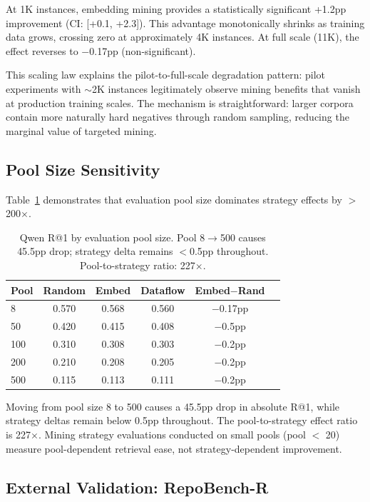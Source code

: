 \documentclass[11pt,a4paper]{article}
\begin{document}
At 1K instances, embedding mining provides a statistically significant +1.2pp improvement (CI: [+0.1, +2.3]).
This advantage monotonically shrinks as training data grows, crossing zero at approximately 4K instances.
At full scale (11K), the effect reverses to $-$0.17pp (non-significant).

This scaling law explains the pilot-to-full-scale degradation pattern: pilot experiments with $\sim$2K instances legitimately observe mining benefits that vanish at production training scales.
The mechanism is straightforward: larger corpora contain more naturally hard negatives through random sampling, reducing the marginal value of targeted mining.

\subsection{Pool Size Sensitivity}

Table~\ref{tab:pool_size} demonstrates that evaluation pool size dominates strategy effects by $>$200$\times$.

\begin{table}[t]
\centering
\small
\begin{tabular}{lccccc}
\toprule
Pool & Random & Embed & Dataflow & Embed$-$Rand \\
\midrule
8 & 0.570 & 0.568 & 0.560 & $-$0.17pp \\
50 & 0.420 & 0.415 & 0.408 & $-$0.5pp \\
100 & 0.310 & 0.308 & 0.303 & $-$0.2pp \\
200 & 0.210 & 0.208 & 0.205 & $-$0.2pp \\
500 & 0.115 & 0.113 & 0.111 & $-$0.2pp \\
\bottomrule
\end{tabular}
\caption{Qwen R@1 by evaluation pool size. Pool 8$\to$500 causes 45.5pp drop; strategy delta remains $<$0.5pp throughout. Pool-to-strategy ratio: 227$\times$.}
\label{tab:pool_size}
\end{table}

Moving from pool size 8 to 500 causes a 45.5pp drop in absolute R@1, while strategy deltas remain below 0.5pp throughout.
The pool-to-strategy effect ratio is 227$\times$.
Mining strategy evaluations conducted on small pools (pool $<$ 20) measure pool-dependent retrieval ease, not strategy-dependent improvement.

\subsection{External Validation: RepoBench-R}
\end{document}
